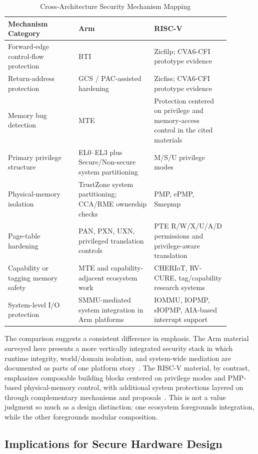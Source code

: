 \begin{table}[htbp]
\centering
\caption{Cross-Architecture Security Mechanism Mapping}
\label{tab:cross_arch_security_mapping}
\begin{tabular}{@{}p{0.28\linewidth}p{0.30\linewidth}p{0.30\linewidth}@{}}
\toprule
\textbf{Mechanism Category} & \textbf{Arm} & \textbf{RISC-V} \\ \midrule
Forward-edge control-flow protection & BTI & Zicfilp; CVA6-CFI prototype evidence \\
Return-address protection & GCS / PAC-assisted hardening & Zicfiss; CVA6-CFI prototype evidence \\
Memory bug detection & MTE & Protection centered on privilege and memory-access control in the cited materials \\
Primary privilege structure & EL0--EL3 plus Secure/Non-secure system partitioning & M/S/U privilege modes \\
Physical-memory isolation & TrustZone system partitioning; CCA/RME ownership checks & PMP, ePMP, Smepmp \\
Page-table hardening & PAN, PXN, UXN, privileged translation controls & PTE R/W/X/U/A/D permissions and privilege-aware translation \\
Capability or tagging memory safety & MTE and capability-adjacent ecosystem work & CHERIoT, RV-CURE, tag/capability research systems \\
System-level I/O protection & SMMU-mediated system integration in Arm platforms & IOMMU, IOPMP, sIOPMP, AIA-based interrupt support \\ \bottomrule
\end{tabular}
\end{table}

The comparison suggests a consistent difference in emphasis. The Arm material surveyed here presents a more vertically integrated security stack in which runtime integrity, world/domain isolation, and system-wide mediation are documented as parts of one platform story~\cite{armv-a,arm_cca_spec,arm_rme_spec}. The RISC-V material, by contrast, emphasizes composable building blocks centered on privilege modes and PMP-based physical-memory control, with additional system protections layered on through complementary mechanisms and proposals~\cite{riscv_privileged,feng2024siopmp}. This is not a value judgment so much as a design distinction: one ecosystem foregrounds integration, while the other foregrounds modular composition.

\subsection{Implications for Secure Hardware Design}

